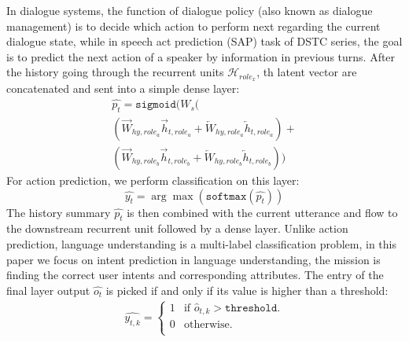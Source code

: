 \documentclass[11pt,letterpaper]{article}
\begin{document}
In dialogue systems, the function of dialogue policy (also known as dialogue management) is to decide which action to perform next regarding the current dialogue state, while in speech act prediction (SAP) task of DSTC series, the goal is to predict the next action of a speaker by information in previous turns.
After the history going through the recurrent units $\mathcal{H}_{role_x}$, th latent vector are concatenated and sent into a simple dense layer:
\begin{multline*}
\hat{p_t} = \mathtt{sigmoid}(W_{s}( \\
(\overrightarrow{W}_{hy,role_a}\overrightarrow{h}_{t,role_a}  
+\overleftarrow{W}_{hy,role_a}\overleftarrow{h}_{t,role_a}) + \\ 
(\overrightarrow{W}_{hy,role_b}\overrightarrow{h}_{t,role_b} + \overleftarrow{W}_{hy,role_b}\overleftarrow{h}_{t,role_b}))
\end{multline*}
For action prediction, we perform classification on this layer:
\begin{equation*}
\hat{y_t} = \arg\max (\mathtt{softmax}(\hat{p_t}))
\end{equation*}
The history summary $\hat{p_t}$ is then combined with the current utterance and flow to the downstream recurrent unit followed by a dense layer. Unlike action prediction, language understanding is a multi-label classification problem, in this paper we focus on intent prediction in language understanding, the mission is finding the correct user intents and corresponding attributes. The entry of the final layer output $\hat{o_t}$ is picked if and only if its value is higher than a threshold:
\begin{gather*}
\hat{y_{t, k}} =
  \begin{cases}
    1 & \text{if } \hat{o}_{t, k} > \mathtt{threshold}. \\
    0 & \text{otherwise}.\\
  \end{cases}
\end{gather*}
\end{document}
